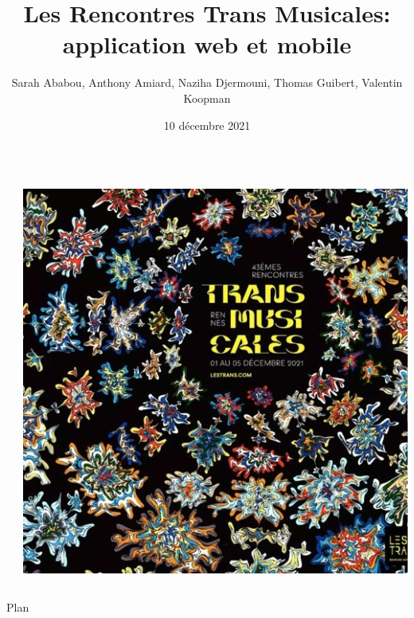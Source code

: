\documentclass{beamer}
\begin{document}
\title{Les Rencontres Trans Musicales: application web et mobile}
\author{Sarah Ababou, Anthony Amiard, Naziha Djermouni, Thomas Guibert, Valentin
        Koopman}
\date{10 décembre 2021}

\begin{frame}

\begin{columns}

\begin{column}{.6\textwidth}

\titlepage

\end{column}

\begin{column}{.4\textwidth}

\includegraphics[width=\textwidth]{trans-2021.jpg}

\end{column}

\end{columns}

\end{frame}

\begin{frame}{Plan}

\tableofcontents

\end{frame}
\end{document}
